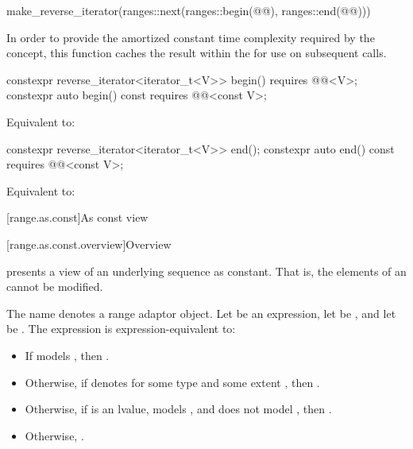 \begin{itemdescr}
\pnum
\returns
\begin{codeblock}
make_reverse_iterator(ranges::next(ranges::begin(@@), ranges::end(@@)))
\end{codeblock}

\pnum
\remarks
In order to provide the amortized constant time complexity required by
the  concept, this function caches the result within the
 for use on subsequent calls.
\end{itemdescr}

%
\begin{itemdecl}
constexpr reverse_iterator<iterator_t<V>> begin() requires @@<V>;
constexpr auto begin() const requires @@<const V>;
\end{itemdecl}

\begin{itemdescr}
\pnum
\effects
Equivalent to: 
\end{itemdescr}

%
\begin{itemdecl}
constexpr reverse_iterator<iterator_t<V>> end();
constexpr auto end() const requires @@<const V>;
\end{itemdecl}

\begin{itemdescr}
\pnum
\effects
Equivalent to: 
\end{itemdescr}

[range.as.const]{As const view}

[range.as.const.overview]{Overview}

\pnum
{} presents a view of an underlying sequence as constant.
That is, the elements of an  cannot be modified.

\pnum
The name  denotes
a range adaptor object.
Let  be an expression,
let  be , and
let  be .
The expression  is expression-equivalent to:
\begin{itemize}
\item
If  models ,
then .
\item
Otherwise,
if  denotes 
for some type  and some extent ,
then .
\item
Otherwise,
if  is an lvalue,
 models , and
 does not model ,
then .
\item
Otherwise, .
\end{itemize}

